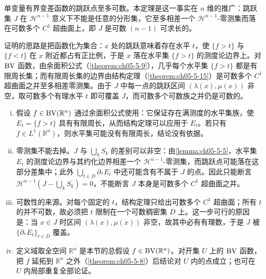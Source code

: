 \documentclass[../../main.tex]{subfiles}%
\begin{document}
\begin{remark}\label{remark:ch05-thm-5-17-动机}
单变量有界变差函数的跳跃点至多可数。本定理是这一事实在 $n$ 维的推广：跳跃集 $J$ 在 $\mathcal{H}^{n-1}$ 意义下不能是任意的分形集，它至多相差一个 $\mathcal{H}^{n-1}$-零测集而落在可数多个 $C^1$ 超曲面上，即 $J$ 是可数 $(n-1)$ 可求长的。

证明的思路是把函数化为集合：$x$ 处的跳跃意味着存在水平 $t$，使 $\{f>t\}$ 与 $\{f<t\}$ 在 $x$ 附近都占有正比例，于是 $x$ 落在水平集 $\{f>t\}$ 的测度论边界上。对 $\mathrm{BV}$ 函数，由余面积公式（\cref{theorem:ch05-5-9}），几乎每个水平集 $\{f>t\}$ 都是有限周长集；而有限周长集的边界由结构定理（\cref{theorem:ch05-5-15}）是可数多个 $C^1$ 超曲面之并至多相差零测集。由于 $J$ 中每一点的跳跃区间 $(\lambda(x),\mu(x))$ 非空，取可数多个有理水平 $t$ 即可覆盖 $J$，而可数多个可数族之并仍是可数的。%
\end{remark}

\begin{remark}\label{remark:ch05-thm-5-17-条件}
\begin{enumerate}[(i)]
\item 假设 $f\in\mathrm{BV}(\mathbb{R}^n)$ 通过余面积公式使用：它保证存在满测度的水平集族，使 $E_t=\{f>t\}$ 具有有限周长，从而结构定理可以应用于 $E_t$。若只有 $f\in L^1(\mathbb{R}^n)$，则水平集可能没有有限周长，结论没有依据。
\item 零测集不能去掉。$J$ 与 $\bigcup_{k}S_k$ 的差别可以非空：由\cref{lemma:ch05-5-5}，水平集 $E_t$ 的测度论边界与其约化边界相差一个 $\mathcal{H}^{n-1}$-零测集，而跳跃点可能落在这部分差集中；此外 $\bigcup_{t\in D}\partial_*E_t$ 中还可能含有不属于 $J$ 的点。因此只能断言 $\mathcal{H}^{n-1}(J-\bigcup_{k}S_k)=0$，不能断言 $J$ 本身是可数多个 $C^1$ 超曲面之并。%
\item 可数性的来源。对每个固定的 $t$，结构定理只给出可数多个 $C^1$ 超曲面；所有 $t$ 的并不可数，故必须把 $t$ 限制在一个可数稠密集 $D$ 上。这一步可行的原因是：当 $x\in J$ 时区间 $(\lambda(x),\mu(x))$ 非空，故其中必有有理数，于是 $J$ 被 $\{\partial_*E_t\}_{t\in D}$ 覆盖。
\item 定义域取全空间 $\mathbb{R}^n$ 是本节的总假设 $f\in\mathrm{BV}(\mathbb{R}^n)$。对开集 $U$ 上的 $\mathrm{BV}$ 函数，把 $f$ 延拓到 $\mathbb{R}^n$ 之外（\cref{theorem:ch05-5-8}）后结论对 $U$ 内的点成立；也可在 $U$ 内局部重复全部论证。%
\end{enumerate}
\end{remark}
\end{document}
